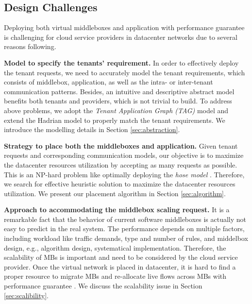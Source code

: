 \documentclass[review]{elsarticle}
\begin{document}

\subsection{Design Challenges}

Deploying both virtual middleboxes and application with performance guarantee is challenging for cloud service providers in datacenter networks due to several reasons following. 

\textbf{Model to specify the tenants' requirement.}
In order to effectively deploy the tenant requests, we need to accurately model the tenant requirements, which consists of middlebox, application, as well as the intra- or inter-tenant communication patterns. Besides, an intuitive and descriptive abstract model benefits both tenants and providers, which is not trivial to build. To address above problems, we adopt the \emph{Tenant Application Graph (TAG)} \cite{cloudmirror} model and extend the Hadrian \cite{B13cta} model to properly match the tenant requirements. We introduce the modelling details in Section \ref{sec:abstraction}. 


\textbf{Strategy to place both the middleboxes and application.}
Given tenant requests and corresponding communication models, our objective is to maximize the datacenter resources utilization by accepting as many requests as possible. This is an NP-hard problem like optimally deploying the \emph{hose model} \cite{hose_model, cloudmirror}. Therefore, we search for effective heuristic solution to maximize the datacenter resources utilization. We present our placement algorithm in Section \ref{sec:algorithm}. 

\textbf{Approach to accommodating the middlebox scaling request.}
It is a remarkable fact that %
the behavior of current software middleboxes is actually not easy to predict in the real system. 
The performance depends on multiple factors, including workload like traffic demands, type and number of rules, and middelbox design, e.g., algorithm design, systematical implementation. 
Therefore, %
the scalability of MBs is important and need to be considered by the cloud service provider. Once the virtual network is placed in datacenter, it is hard to find a proper resource to migrate MBs and re-allocate live flows across MBs with performance guarantee \cite{G13dio}. We discuss the scalability issue in Section \ref{sec:scalibility}.
\end{document}
